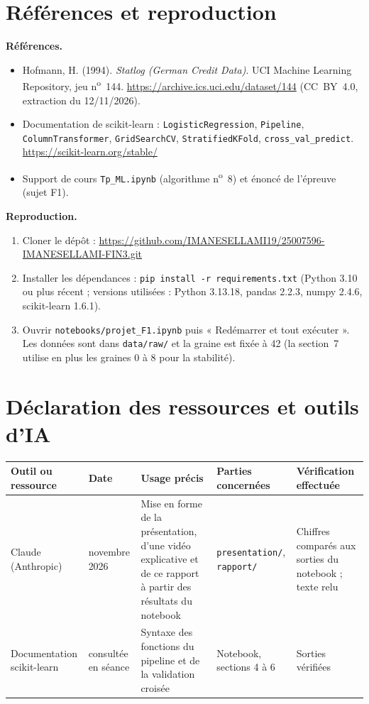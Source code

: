 \documentclass[10.5pt,a4paper]{article}
\begin{document}
\section{Références et reproduction}
\textbf{Références.}
\begin{itemize}
\item Hofmann, H. (1994). \emph{Statlog (German Credit Data)}. UCI Machine Learning Repository, jeu n\textsuperscript{o}~144. \url{https://archive.ics.uci.edu/dataset/144} (CC~BY~4.0, extraction du 12/11/2026).
\item Documentation de scikit-learn : \texttt{LogisticRegression}, \texttt{Pipeline}, \texttt{ColumnTransformer}, \texttt{GridSearchCV}, \texttt{StratifiedKFold}, \texttt{cross\_val\_predict}. \url{https://scikit-learn.org/stable/}
\item Support de cours \texttt{Tp\_ML.ipynb} (algorithme n\textsuperscript{o}~8) et énoncé de l'épreuve (sujet F1).
\end{itemize}
\textbf{Reproduction.}
\begin{enumerate}
\item Cloner le dépôt : \url{https://github.com/IMANESELLAMI19/25007596-IMANESELLAMI-FIN3.git}
\item Installer les dépendances : \texttt{pip install -r requirements.txt} (Python 3.10 ou plus récent ; versions utilisées : Python 3.13.18, pandas 2.2.3, numpy 2.4.6, scikit-learn 1.6.1).
\item Ouvrir \texttt{notebooks/projet\_F1.ipynb} puis « Redémarrer et tout exécuter ». Les données sont dans \texttt{data/raw/} et la graine est fixée à 42 (la section~7 utilise en plus les graines 0 à 8 pour la stabilité).
\end{enumerate}

\section*{Déclaration des ressources et outils d'IA}
\begin{center}\small
\begin{tabular}{@{}>{\raggedright\arraybackslash}p{2.6cm} >{\raggedright\arraybackslash}p{2cm} >{\raggedright\arraybackslash}p{4.4cm} >{\raggedright\arraybackslash}p{2.4cm} >{\raggedright\arraybackslash}p{3.2cm}@{}}
\toprule
\textbf{Outil ou ressource} & \textbf{Date} & \textbf{Usage précis} & \textbf{Parties concernées} & \textbf{Vérification effectuée}\\\midrule
Claude (Anthropic) & novembre 2026 & Mise en forme de la présentation, d'une vidéo explicative et de ce rapport à partir des résultats du notebook & \texttt{presentation/}, \texttt{rapport/} & Chiffres comparés aux sorties du notebook ; texte relu\\
Documentation scikit-learn & consultée en séance & Syntaxe des fonctions du pipeline et de la validation croisée & Notebook, sections 4 à 6 & Sorties vérifiées\\
\bottomrule
\end{tabular}
\end{center}
\end{document}
